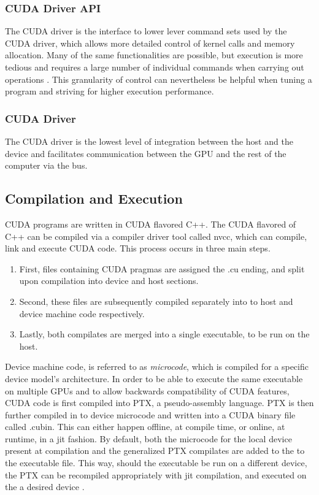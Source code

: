 \subsubsection{CUDA Driver API}
The CUDA driver is the interface to lower lever command sets used by the CUDA driver, which allows more detailed control
of kernel calls and memory allocation. Many of the same functionalities are possible,
but execution is more tedious and requires a large number of individual commands
when carrying out operations \cite{driver}. This granularity of control can nevertheless be
helpful when tuning a program and striving for higher execution performance.
\subsubsection{CUDA Driver}

The CUDA driver is the lowest level of integration between the host and the device
and facilitates communication between the \Gls{GPU} and the rest of the computer via the bus.


\subsection{Compilation and Execution}


CUDA programs are written in CUDA flavored C++.  The CUDA flavored of C++
can be compiled via a compiler driver tool called nvcc, which can compile, link and execute CUDA code.  This process occurs
 in three main steps.
 \begin{enumerate}

\item First,
files containing CUDA pragmas are assigned the .cu ending, and split upon
compilation into device and host sections.
\item Second, these files are subsequently
compiled separately into to host and device machine code respectively.
\item Lastly, both compilates are merged into a single executable, to be run on the host.
\end{enumerate}
\par
Device machine code, is referred to as  \textit{microcode},
which is compiled for a specific device model's architecture. In order to be able
to execute the same executable
on multiple \glspl{GPU} and to allow backwards compatibility of CUDA features, CUDA code is
first compiled into \Gls{PTX}, a pseudo-assembly language.  \gls{PTX} is then
further compiled in to device microcode and written into a CUDA binary file called .cubin.
This can either happen offline, at compile time,
or online, at runtime, in a \gls{jit} fashion.  By default, both
the microcode for the local device present at compilation and the generalized
\gls{PTX} compilates are added to the to the executable file.
This way, should the executable be run on a different device, the \gls{PTX} can
be recompiled appropriately with \gls{jit} compilation, and executed on the a
desired device \cite{Wilt}.

